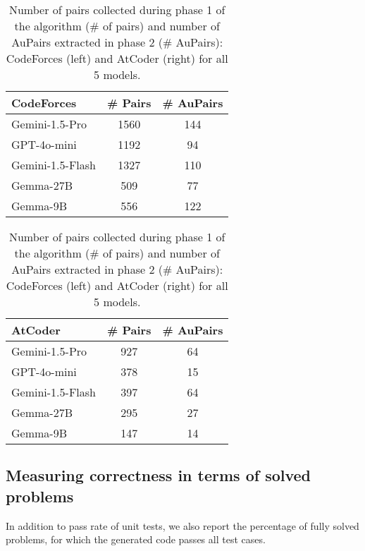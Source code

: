 \documentclass[11pt, a4paper, logo, copyright]{googledeepmind}
\def\aupairs/{\textcolor{golden}{Au}Pairs}
\begin{document}
\begin{table}[H]
    \centering
    \begin{minipage}{0.45\linewidth}
        \centering
        \begin{tabular}{lcc}
            \toprule
             CodeForces & \# Pairs & \# \aupairs/\\
             \midrule
             Gemini-1.5-Pro & 1560 & 144\\
             \rowcolor{lavender}
             GPT-4o-mini & 1192 & 94\\
             Gemini-1.5-Flash & 1327 &110\\
             \rowcolor{lavender}
             Gemma-27B & 509 & 77\\
             Gemma-9B & 556 & 122\\
            \bottomrule
        \end{tabular}
    \end{minipage}
    \begin{minipage}{0.45\linewidth}
        \centering
        \begin{tabular}{lcc}
            \toprule
             AtCoder & \# Pairs & \# \aupairs/ \\
             \midrule
             \rowcolor{lavender}
             Gemini-1.5-Pro & 927 & 64\\
             GPT-4o-mini & 378 & 15\\
             \rowcolor{lavender}
             Gemini-1.5-Flash & 397 & 64\\
             Gemma-27B & 295 & 27\\
             \rowcolor{lavender}
             Gemma-9B & 147 & 14\\
            \bottomrule
        \end{tabular}
    \end{minipage}

\caption{Number of pairs collected during phase 1 of the algorithm ($\#$ of pairs) and number of \aupairs/  extracted in  phase 2 ($\#$ \aupairs/): CodeForces (left) and AtCoder (right) for all 5 models.}
\label{tab:number_of_pairs}
\end{table}


\subsection{Measuring correctness in terms of solved problems}\label{sec:strict_accuracy}

In addition to pass rate of unit tests, we also report the percentage of fully solved problems, for which the generated code passes all test cases. 
\end{document}

